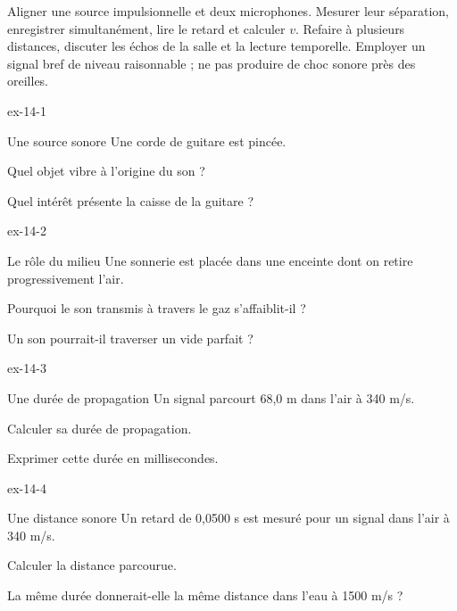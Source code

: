 \begin{experience}Aligner une source impulsionnelle et deux microphones. Mesurer leur séparation, enregistrer simultanément, lire le retard et calculer $v$. Refaire à plusieurs distances, discuter les échos de la salle et la lecture temporelle. Employer un signal bref de niveau raisonnable ; ne pas produire de choc sonore près des oreilles.\end{experience}
\exercices
{}
\begin{blocLivre}{ex-14-1}\begin{exercice}[1]{Une source sonore}
Une corde de guitare est pincée.
\begin{questions}
\item Quel objet vibre à l’origine du son ?
\item Quel intérêt présente la caisse de la guitare ?
\end{questions}
\end{exercice}\end{blocLivre}
\begin{blocLivre}{ex-14-2}\begin{exercice}[1]{Le rôle du milieu}
Une sonnerie est placée dans une enceinte dont on retire progressivement l’air.
\begin{questions}
\item Pourquoi le son transmis à travers le gaz s’affaiblit-il ?
\item Un son pourrait-il traverser un vide parfait ?
\end{questions}
\end{exercice}\end{blocLivre}
\begin{blocLivre}{ex-14-3}\begin{exercice}[1]{Une durée de propagation}
Un signal parcourt 68,0 m dans l’air à 340 m/s.
\begin{questions}
\item Calculer sa durée de propagation.
\item Exprimer cette durée en millisecondes.
\end{questions}
\end{exercice}\end{blocLivre}
\begin{blocLivre}{ex-14-4}\begin{exercice}[1]{Une distance sonore}
Un retard de 0,0500 s est mesuré pour un signal dans l’air à 340 m/s.
\begin{questions}
\item Calculer la distance parcourue.
\item La même durée donnerait-elle la même distance dans l’eau à 1500 m/s ?
\end{questions}
\end{exercice}\end{blocLivre}
